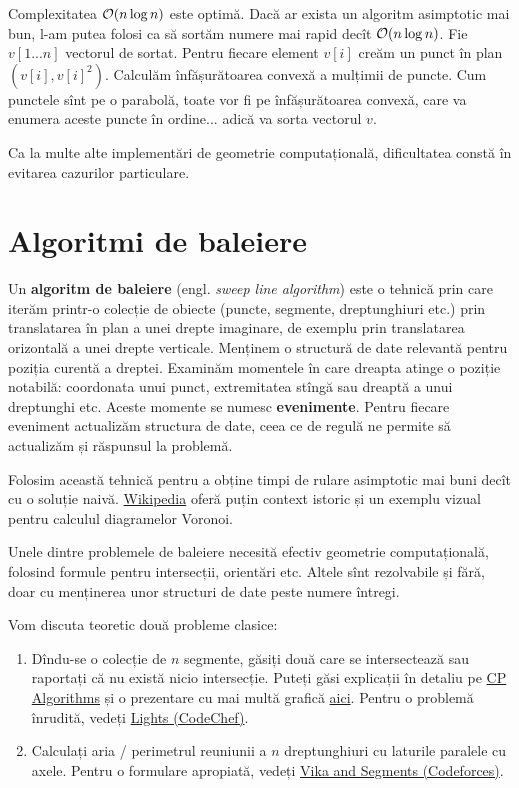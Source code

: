 \documentclass[../main.tex]{subfiles}
\begin{document}
Complexitatea $\mathcal{O}(n \log n)$ este optimă. Dacă ar exista un algoritm asimptotic mai bun, l-am putea folosi ca să sortăm numere mai rapid decît $\mathcal{O}(n \log n)$. Fie $v[1...n]$ vectorul de sortat. Pentru fiecare element $v[i]$ creăm un punct în plan $(v[i], v[i]^2)$. Calculăm înfășurătoarea convexă a mulțimii de puncte. Cum punctele sînt pe o parabolă, toate vor fi pe înfășurătoarea convexă, care va enumera aceste puncte în ordine... adică va sorta vectorul $v$.

Ca la multe alte implementări de geometrie computațională, dificultatea constă în evitarea cazurilor particulare.

\section{Algoritmi de baleiere}

Un \textbf{algoritm de baleiere} (engl. \textit{sweep line algorithm}) este o tehnică prin care iterăm printr-o colecție de obiecte (puncte, segmente, dreptunghiuri etc.) prin translatarea în plan a unei drepte imaginare, de exemplu prin translatarea orizontală a unei drepte verticale. Menținem o structură de date relevantă pentru poziția curentă a dreptei. Examinăm momentele în care dreapta atinge o poziție notabilă: coordonata unui punct, extremitatea stîngă sau dreaptă a unui dreptunghi etc. Aceste momente se numesc \textbf{evenimente}. Pentru fiecare eveniment actualizăm structura de date, ceea ce de regulă ne permite să actualizăm și răspunsul la problemă.

Folosim această tehnică pentru a obține timpi de rulare asimptotic mai buni decît cu o soluție naivă. \href{https://en.wikipedia.org/wiki/Sweep_line_algorithm}{Wikipedia} oferă puțin context istoric și un exemplu vizual pentru calculul diagramelor Voronoi.

Unele dintre problemele de baleiere necesită efectiv geometrie computațională, folosind formule pentru intersecții, orientări etc. Altele sînt rezolvabile și fără, doar cu menținerea unor structuri de date peste numere întregi.

Vom discuta teoretic două probleme clasice:

\begin{enumerate}
  \item Dîndu-se o colecție de $n$ segmente, găsiți două care se intersectează sau raportați că nu există nicio intersecție. Puteți găsi explicații în detaliu pe \href{https://cp-algorithms.com/geometry/intersecting_segments.html}{CP Algorithms} și o prezentare cu mai multă grafică \href{https://www.cs.rpi.edu/~cutler/classes/computationalgeometry/F23/lectures/02_line_segment_intersections.pdf#page=22}{aici}. Pentru o problemă înrudită, vedeți \href{https://www.codechef.com/problems/LIGHT}{Lights (CodeChef)}.

  \item Calculați aria / perimetrul reuniunii a $n$ dreptunghiuri cu laturile paralele cu axele. Pentru o formulare apropiată, vedeți \href{https://codeforces.com/problemset/problem/610/D}{Vika and Segments (Codeforces)}.
\end{enumerate}
\end{document}
